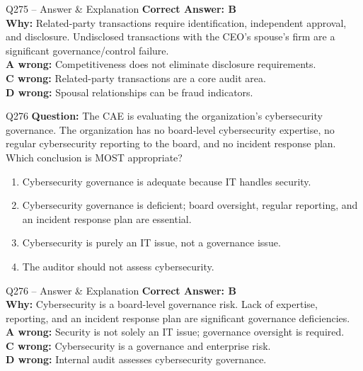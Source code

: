 \documentclass[aspectratio=169,10pt]{beamer}
\begin{document}
	\begin{frame}[t]{Q275 -- Answer \& Explanation}
		\small
		\textbf{Correct Answer: B} \\[4pt]
		\textbf{Why:} Related-party transactions require identification, independent approval, and disclosure. Undisclosed transactions with the CEO's spouse's firm are a significant governance/control failure. \\[4pt]
		\textbf{A wrong:} Competitiveness does not eliminate disclosure requirements. \\[2pt]
		\textbf{C wrong:} Related-party transactions are a core audit area. \\[2pt]
		\textbf{D wrong:} Spousal relationships can be fraud indicators.
	\end{frame}
	
	\begin{frame}[t]{Q276}
		\small
		\textbf{Question:} The CAE is evaluating the organization's cybersecurity governance. The organization has no board-level cybersecurity expertise, no regular cybersecurity reporting to the board, and no incident response plan. Which conclusion is MOST appropriate?
		\begin{enumerate}[label=\Alph*.,itemsep=1pt,topsep=2pt]
			\item Cybersecurity governance is adequate because IT handles security.
			\item Cybersecurity governance is deficient; board oversight, regular reporting, and an incident response plan are essential.
			\item Cybersecurity is purely an IT issue, not a governance issue.
			\item The auditor should not assess cybersecurity.
		\end{enumerate}
	\end{frame}
	
	\begin{frame}[t]{Q276 -- Answer \& Explanation}
		\small
		\textbf{Correct Answer: B} \\[4pt]
		\textbf{Why:} Cybersecurity is a board-level governance risk. Lack of expertise, reporting, and an incident response plan are significant governance deficiencies. \\[4pt]
		\textbf{A wrong:} Security is not solely an IT issue; governance oversight is required. \\[2pt]
		\textbf{C wrong:} Cybersecurity is a governance and enterprise risk. \\[2pt]
		\textbf{D wrong:} Internal audit assesses cybersecurity governance.
	\end{frame}
	
\end{document}
